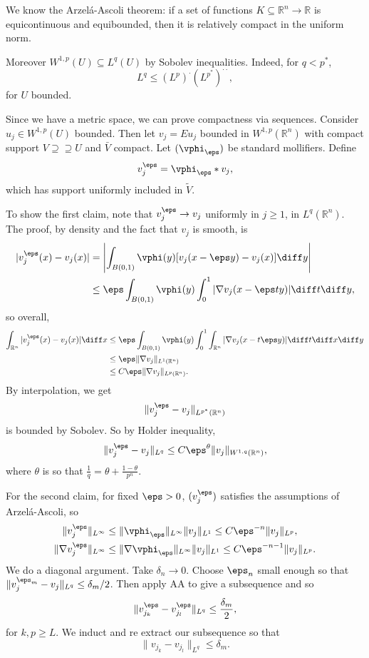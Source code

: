 \documentclass[12pt]{article}
\begin{document}
\begin{proofbox}
	We know the Arzel\'a-Ascoli theorem: if a set of functions $K \subseteq \mathbb{R}^n \to \mathbb{R}$ is equicontinuous and equibounded, then it is relatively compact in the uniform norm.

	Moreover $W^{1, p}(U) \subseteq L^q(U)$ by Sobolev inequalities. Indeed, for $q < p^{\ast}$,
	\[
	L^q \leq (L^p)^{\cdot} (L^{p^{\ast}})^{\cdot \cdot},
	\]
	for $U$ bounded.

	Since we have a metric space, we can prove compactness via sequences. Consider $u_j \in W^{1, p}(U)$ bounded. Then let $v_j = E u_j$ bounded in $W^{1, p}(\mathbb{R}^n)$ with compact support $V \supseteq \supseteq U$ and $\bar V$ compact. Let $(\vphi_{\eps})$ be standard mollifiers. Define
	\[
	v_j^{\eps} = \vphi_\eps \ast v_j,
	\]
	which has support uniformly included in $\tilde V$.

	To show the first claim, note that $v_j^{\eps} \to v_j$ uniformly in $j \geq 1$, in $L^q(\mathbb{R}^n)$. The proof, by density and the fact that $v_j$ is smooth, is
	\begin{align*}
		|v_j^{\eps}(x) - v_j(x)| &= \left| \int_{B(0,1)} \vphi(y) [v_j(x - \eps y) - v_j(x)] \diff y \right| \\
					 &\leq \eps \int_{B(0, 1)} \vphi(y) \int_0^1 |\nabla v_j(x - \eps ty)| \diff t \diff y,
	\end{align*}
	so overall,
	\begin{align*}
		\int_{\mathbb{R}^n} |v_j^{\eps}(x) - v_j(x)| \diff x &\leq \eps \int_{B(0, 1)} \vphi(y) \int_0^1 \int_{\mathbb{R}^n} |\nabla v_j(x - t \eps y) |\diff t \diff x \diff y \\
								     &\leq \eps \|\nabla v_j\|_{L^1(\mathbb{R}^n)} \\
								     &\leq C \eps \|\nabla v_j\|_{L^p(\mathbb{R}^n)}.
	\end{align*}
	By interpolation, we get
	\[
	\|v_j^{\eps} - v_j\|_{L^{p^{\ast}}(\mathbb{R}^n)}
	\]
	is bounded by Sobolev. So by Holder inequality,
	\[
	\|v_j^\eps - v_j\|_{L^q} \leq C \eps^{\theta} \|v_j\|_{W^{1,q}(\mathbb{R}^n)},
	\]
	where $\theta$ is so that $\frac{1}{q} = \theta + \frac{1 - \theta}{p^{n}}.$

	For the second claim, for fixed $\eps > 0$, $(v_j^{\eps})$ satisfies the assumptions of Arzel\'a-Ascoli, so
	\begin{align*}
		\|v_j^{\eps}\|_{L^\infty} &\leq \|\vphi_\eps\|_{L^\infty} \|v_j\|_{L^1} \leq C \eps^{-n} \|v_j\|_{L^p}, \\
		\|\nabla v_j^\eps\|_{L^\infty} &\leq \|\nabla \vphi_\eps\|_{L^\infty} \|v_j\|_{L^1} \leq C \eps^{-n - 1} \|v_j\|_{L^p}.
	\end{align*}
	We do a diagonal argument. Take $\delta_n \to 0$. Choose $\eps_n$ small enough so that $\|v_j^{\eps_m} - v_j\|_{L^q} \leq \delta_m/2$. Then apply AA to give a subsequence and so
	\[
	\|v_{j_k}^{\eps} - v_{j_l}^{\eps}\|_{L^q} \leq \frac{\delta_m}{2},
	\]
	for $k, p \geq L$. We induct and re extract our subsequence so that
	\[
	\|v_{j_k} - v_{j_l}\|_{L^q} \leq \delta_m.
	\]
\end{proofbox}
\end{document}

